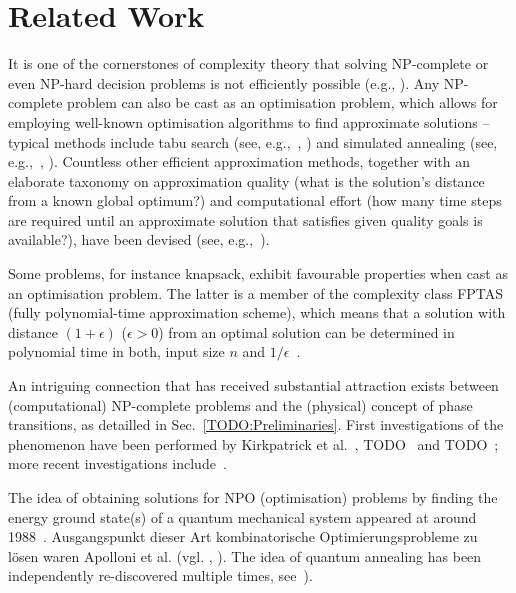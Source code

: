 
\section{Related Work}
It is one of the cornerstones of complexity theory that solving NP-complete or even NP-hard decision problems is not efficiently possible (e.g., \cite{cook1971complexity,murty1987some}). Any NP-complete problem can also be cast as an optimisation problem, which allows for employing well-known optimisation algorithms to find approximate solutions -- typical methods include tabu search (see, e.g.,~\cite{glover2013tabu}, \cite{gendreau1994tabu}) and simulated annealing (see, e.g.,~\cite{kirkpatrick1983optimization}, \cite{chen1995chaotic}). Countless other efficient approximation methods, together with an elaborate taxonomy on approximation quality (what is the solution's distance from a known global optimum?) and computational effort (how many time steps are required until an approximate solution that satisfies given quality goals is available?), have been devised (see, e.g.,~\cite{NPO-Compendium}).

Some problems, for instance knapsack, exhibit favourable properties
when cast as an optimisation problem. The latter is a member of the
complexity class FPTAS (fully polynomial-time approximation scheme),
which means that a solution with distance \((1+\epsilon)\) ($\epsilon > 0$)
from an optimal solution can be determined in polynomial time in both,
input size \(n\) and \(1/\epsilon\)~\cite{chen1995chaotic}.

An intriguing connection that has received substantial attraction exists between (computational) NP-complete problems and the (physical) concept of phase transitions, as detailled in Sec.~\ref{TODO:Preliminaries}. First investigations of the phenomenon have been performed by Kirkpatrick et al.~\cite{kirkpatrick1994critical}, TODO~\cite{TODO monasson1999determining} and TODO~\cite{TODO}; more recent investigations include~\cite{TODO, TODO, TODO}.

The idea of obtaining solutions for NPO (optimisation) problems by finding the energy ground state(s) of a quantum mechanical system appeared at around 1988~\cite{TODO: Originalpaper,albash2016adiabatic}. Ausgangspunkt dieser Art kombinatorische Optimierungsprobleme zu lösen waren Apolloni et al. (vgl. \cite{apolloni1989quantum}, \cite{apolloni1988numerical}). The idea of quantum annealing has been independently re-discovered multiple times, see~\cite{albash2016adiabatic,finnila1994quantum,amara1993global,kadowaki1998quantum}).

